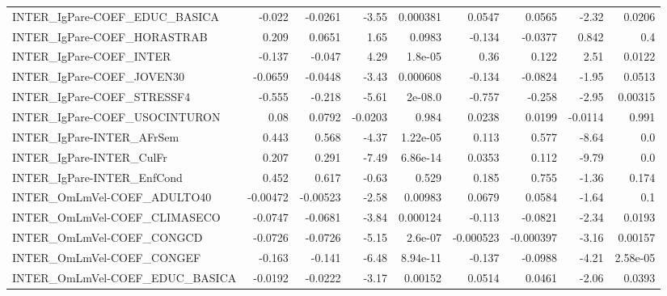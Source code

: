 \begin{tabular}{lrrrrrrrr}
INTER\_IgPare-COEF\_EDUC\_BASICA         &      -0.022 &      -0.0261 &   -3.55 & 0.000381 &     0.0547 &      0.0565 &        -2.32 &        0.0206 \\
INTER\_IgPare-COEF\_HORASTRAB           &       0.209 &       0.0651 &    1.65 &   0.0983 &     -0.134 &     -0.0377 &        0.842 &           0.4 \\
INTER\_IgPare-COEF\_INTER               &      -0.137 &       -0.047 &    4.29 &  1.8e-05 &       0.36 &       0.122 &         2.51 &        0.0122 \\
INTER\_IgPare-COEF\_JOVEN30             &     -0.0659 &      -0.0448 &   -3.43 & 0.000608 &     -0.134 &     -0.0824 &        -1.95 &        0.0513 \\
INTER\_IgPare-COEF\_STRESSF4            &      -0.555 &       -0.218 &   -5.61 &  2e-08.0 &     -0.757 &      -0.258 &        -2.95 &       0.00315 \\
INTER\_IgPare-COEF\_USOCINTURON         &        0.08 &       0.0792 & -0.0203 &    0.984 &     0.0238 &      0.0199 &      -0.0114 &         0.991 \\
INTER\_IgPare-INTER\_AFrSem             &       0.443 &        0.568 &   -4.37 & 1.22e-05 &      0.113 &       0.577 &        -8.64 &           0.0 \\
INTER\_IgPare-INTER\_CulFr              &       0.207 &        0.291 &   -7.49 & 6.86e-14 &     0.0353 &       0.112 &        -9.79 &           0.0 \\
INTER\_IgPare-INTER\_EnfCond            &       0.452 &        0.617 &   -0.63 &    0.529 &      0.185 &       0.755 &        -1.36 &         0.174 \\
INTER\_OmLmVel-COEF\_ADULTO40           &    -0.00472 &     -0.00523 &   -2.58 &  0.00983 &     0.0679 &      0.0584 &        -1.64 &           0.1 \\
INTER\_OmLmVel-COEF\_CLIMASECO          &     -0.0747 &      -0.0681 &   -3.84 & 0.000124 &     -0.113 &     -0.0821 &        -2.34 &        0.0193 \\
INTER\_OmLmVel-COEF\_CONGCD             &     -0.0726 &      -0.0726 &   -5.15 &  2.6e-07 &  -0.000523 &   -0.000397 &        -3.16 &       0.00157 \\
INTER\_OmLmVel-COEF\_CONGEF             &      -0.163 &       -0.141 &   -6.48 & 8.94e-11 &     -0.137 &     -0.0988 &        -4.21 &      2.58e-05 \\
INTER\_OmLmVel-COEF\_EDUC\_BASICA        &     -0.0192 &      -0.0222 &   -3.17 &  0.00152 &     0.0514 &      0.0461 &        -2.06 &        0.0393 \\

\end{tabular}
